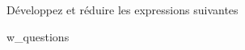 \begin{exo}
    Développez et réduire les expressions suivantes
\end{exo}

\begin{enumerate}
    {
        {w_questions}
    }
\end{enumerate}